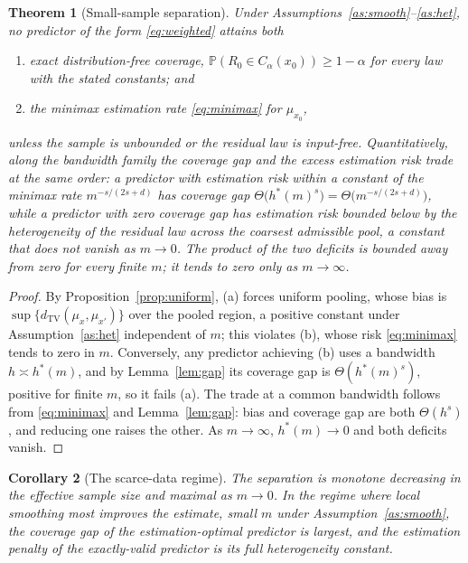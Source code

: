 \documentclass[11pt]{article}
\newtheorem{theorem}{Theorem}
\newtheorem{corollary}[theorem]{Corollary}
\theoremstyle{definition}
\theoremstyle{remark}
\newcommand{\Prob}{\mathbb{P}}
\newcommand{\TV}{\mathrm{TV}}
\newcommand{\dtv}{d_{\TV}}
\begin{document}
\begin{theorem}[Small-sample separation]\label{thm:sep}
Under Assumptions~\ref{as:smooth}--\ref{as:het}, no predictor of the form
\eqref{eq:weighted} attains both
\begin{enumerate}
\item[(a)] exact distribution-free coverage, $\Prob(R_0\in C_\alpha(x_0))\ge 1-\alpha$
  for every law with the stated constants; and
\item[(b)] the minimax estimation rate \eqref{eq:minimax} for $\mu_{x_0}$,
\end{enumerate}
unless the sample is unbounded or the residual law is input-free. Quantitatively, along
the bandwidth family the coverage gap and the excess estimation risk trade at the same
order: a predictor with estimation risk within a constant of the minimax rate
$m^{-s/(2s+d)}$ has coverage gap $\Theta\big(h^{*}(m)^{s}\big)=\Theta\big(m^{-s/(2s+d)}\big)$,
while a predictor with zero coverage gap has estimation risk bounded below by the
heterogeneity of the residual law across the coarsest admissible pool, a constant that
does not vanish as $m\to 0$. The product of the two deficits is bounded away from zero for
every finite $m$; it tends to zero only as $m\to\infty$.
\end{theorem}

\begin{proof}
By Proposition~\ref{prop:uniform}, (a) forces uniform pooling, whose bias is
$\sup\{\dtv(\mu_x,\mu_{x'})\}$ over the pooled region, a positive constant under
Assumption~\ref{as:het} independent of $m$; this violates (b), whose risk
\eqref{eq:minimax} tends to zero in $m$. Conversely, any predictor achieving (b) uses a
bandwidth $h \asymp h^{*}(m)$, and by Lemma~\ref{lem:gap} its coverage gap is
$\Theta(h^{*}(m)^{s})$, positive for finite $m$, so it fails (a). The trade at a common
bandwidth follows from \eqref{eq:minimax} and Lemma~\ref{lem:gap}: bias and coverage gap
are both $\Theta(h^{s})$, and reducing one raises the other. As $m\to\infty$,
$h^{*}(m)\to 0$ and both deficits vanish.
\end{proof}

\begin{corollary}[The scarce-data regime]\label{cor:small}
The separation is monotone decreasing in the effective sample size and maximal as
$m\to 0$. In the regime where local smoothing most improves the estimate, small
$m$ under Assumption~\ref{as:smooth}, the coverage gap of the estimation-optimal
predictor is largest, and the estimation penalty of the exactly-valid predictor is its
full heterogeneity constant.
\end{corollary}
\end{document}
